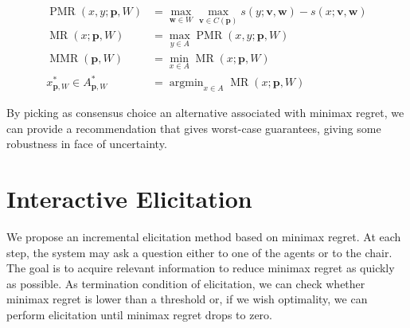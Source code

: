\documentclass[a4paper,twoside]{article}
\newcommand{\profile}{\bm{v}}%
\newcommand{\pprofile}{{\bm{p}}}%
\newcommand{\w}{\bm{w}}
\DeclareMathOperator{\Regret}{Regret}
\DeclareMathOperator{\PMR}{PMR}
\DeclareMathOperator{\MR}{MR}
\DeclareMathOperator{\MMR}{MMR}
\DeclareMathOperator*{\argmin}{argmin}
\begin{document}
\begin{align}
\PMR(x,y; \pprofile, W) & = \max_{\w \in W} \max_{\profile \in C(\pprofile)} s(y; \profile,\w) - s(x; \profile,\w) \\
\MR(x; \pprofile, W) & = \max_{y \in A} \PMR(x,y; \pprofile, W)\\
\MMR(\pprofile,W) & = \min_{x \in A} \MR(x;\pprofile,W) \\
x^{*}_{\pprofile,W} \in A^*_{\pprofile, W} & = \argmin_{x \in A} \MR(x;\pprofile,W) 
\end{align}

By picking as consensus choice an alternative associated with minimax regret, we can provide a recommendation that gives worst-case guarantees, giving some robustness in face of uncertainty. 
%
%


\section{Interactive Elicitation} 
\label{sec:elicit}
We propose an incremental elicitation method based on minimax regret.
At each step, the system may ask a question either to one of the agents or to the chair.
The goal is to acquire relevant information to reduce minimax regret as quickly as possible.
As termination condition of elicitation, we can check whether minimax regret is lower than a threshold or, if we wish optimality, we can perform elicitation until minimax regret drops to zero.
\end{document}
